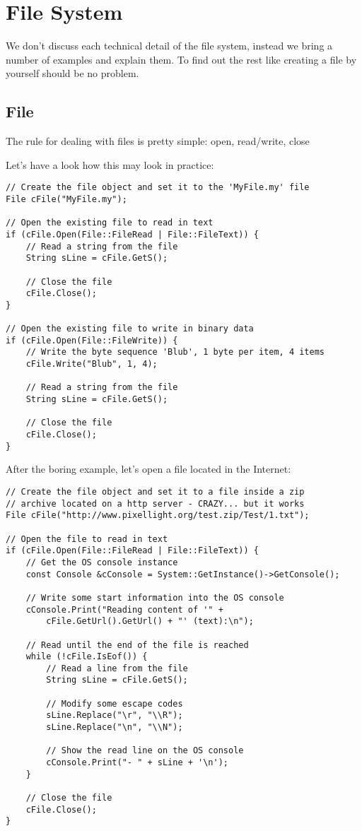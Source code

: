 \section{File System}
We don't discuss each technical detail of the file system, instead we bring a number of examples and explain them. To find out the rest like creating a file by yourself should be no problem.




\subsection{File}
The rule for dealing with files is pretty simple: open, read/write, close

Let's have a look how this may look in practice:

\begin{lstlisting}[caption=File usage example]
// Create the file object and set it to the 'MyFile.my' file
File cFile("MyFile.my");

// Open the existing file to read in text
if (cFile.Open(File::FileRead | File::FileText)) {
	// Read a string from the file
	String sLine = cFile.GetS();

	// Close the file
	cFile.Close();
}

// Open the existing file to write in binary data
if (cFile.Open(File::FileWrite)) {
	// Write the byte sequence 'Blub', 1 byte per item, 4 items
	cFile.Write("Blub", 1, 4);

	// Read a string from the file
	String sLine = cFile.GetS();

	// Close the file
	cFile.Close();
}
\end{lstlisting}

After the boring example, let's open a file located in the Internet:

\begin{lstlisting}[caption=http file usage example]
// Create the file object and set it to a file inside a zip
// archive located on a http server - CRAZY... but it works
File cFile("http://www.pixellight.org/test.zip/Test/1.txt");

// Open the file to read in text
if (cFile.Open(File::FileRead | File::FileText)) {
	// Get the OS console instance
	const Console &cConsole = System::GetInstance()->GetConsole();

	// Write some start information into the OS console
	cConsole.Print("Reading content of '" +
		cFile.GetUrl().GetUrl() + "' (text):\n");

	// Read until the end of the file is reached
	while (!cFile.IsEof()) {
		// Read a line from the file
		String sLine = cFile.GetS();

		// Modify some escape codes
		sLine.Replace("\r", "\\R");
		sLine.Replace("\n", "\\N");

		// Show the read line on the OS console
		cConsole.Print("- " + sLine + '\n');
	}

	// Close the file
	cFile.Close();
}
\end{lstlisting}




